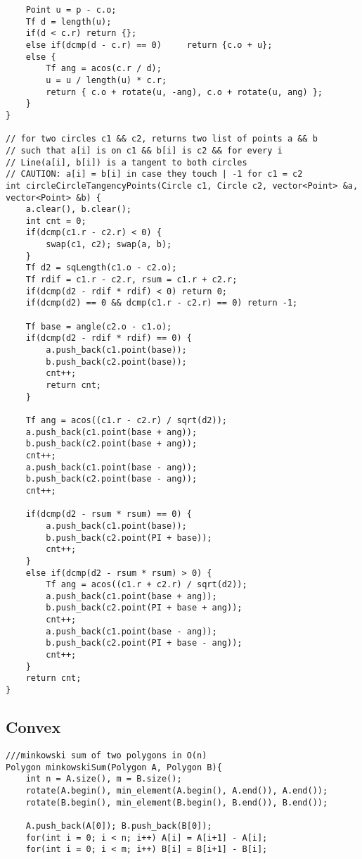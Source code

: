 \documentclass[FSZ,a4paper,onesided]{article}
\begin{document}
\begin{multicols*}{\COLS}
\begin{lstlisting}
    Point u = p - c.o;
    Tf d = length(u);
    if(d < c.r) return {};
    else if(dcmp(d - c.r) == 0)     return {c.o + u};
    else {
        Tf ang = acos(c.r / d);
        u = u / length(u) * c.r;
        return { c.o + rotate(u, -ang), c.o + rotate(u, ang) };
    }
}

// for two circles c1 && c2, returns two list of points a && b
// such that a[i] is on c1 && b[i] is c2 && for every i
// Line(a[i], b[i]) is a tangent to both circles
// CAUTION: a[i] = b[i] in case they touch | -1 for c1 = c2
int circleCircleTangencyPoints(Circle c1, Circle c2, vector<Point> &a, vector<Point> &b) {
    a.clear(), b.clear();
    int cnt = 0;
    if(dcmp(c1.r - c2.r) < 0) {
        swap(c1, c2); swap(a, b);
    }
    Tf d2 = sqLength(c1.o - c2.o);
    Tf rdif = c1.r - c2.r, rsum = c1.r + c2.r;
    if(dcmp(d2 - rdif * rdif) < 0) return 0;
    if(dcmp(d2) == 0 && dcmp(c1.r - c2.r) == 0) return -1;

    Tf base = angle(c2.o - c1.o);
    if(dcmp(d2 - rdif * rdif) == 0) {
        a.push_back(c1.point(base));
        b.push_back(c2.point(base));
        cnt++;
        return cnt;
    }

    Tf ang = acos((c1.r - c2.r) / sqrt(d2));
    a.push_back(c1.point(base + ang));
    b.push_back(c2.point(base + ang));
    cnt++;
    a.push_back(c1.point(base - ang));
    b.push_back(c2.point(base - ang));
    cnt++;

    if(dcmp(d2 - rsum * rsum) == 0) {
        a.push_back(c1.point(base));
        b.push_back(c2.point(PI + base));
        cnt++;
    }
    else if(dcmp(d2 - rsum * rsum) > 0) {
        Tf ang = acos((c1.r + c2.r) / sqrt(d2));
        a.push_back(c1.point(base + ang));
        b.push_back(c2.point(PI + base + ang));
        cnt++;
        a.push_back(c1.point(base - ang));
        b.push_back(c2.point(PI + base - ang));
        cnt++;
    }
    return cnt;
}\end{lstlisting}
\subsection{Convex}
\begin{lstlisting}
///minkowski sum of two polygons in O(n)
Polygon minkowskiSum(Polygon A, Polygon B){
    int n = A.size(), m = B.size();
    rotate(A.begin(), min_element(A.begin(), A.end()), A.end());
    rotate(B.begin(), min_element(B.begin(), B.end()), B.end());

    A.push_back(A[0]); B.push_back(B[0]);
    for(int i = 0; i < n; i++) A[i] = A[i+1] - A[i];
    for(int i = 0; i < m; i++) B[i] = B[i+1] - B[i];


\end{lstlisting}
\end{multicols*}
\end{document}
